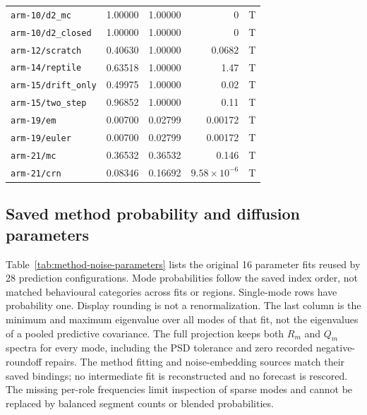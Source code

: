 \documentclass[11pt]{article}
\begin{document}
\begin{longtable}{lrrrl}
\texttt{arm-10/d2\_mc} & 1.00000 & 1.00000 & 0 & T\\
\texttt{arm-10/d2\_closed} & 1.00000 & 1.00000 & 0 & T\\
\texttt{arm-12/scratch} & 0.40630 & 1.00000 & 0.0682 & T\\
\texttt{arm-14/reptile} & 0.63518 & 1.00000 & 1.47 & T\\
\texttt{arm-15/drift\_only} & 0.49975 & 1.00000 & 0.02 & T\\
\texttt{arm-15/two\_step} & 0.96852 & 1.00000 & 0.11 & T\\
\texttt{arm-19/em} & 0.00700 & 0.02799 & 0.00172 & T\\
\texttt{arm-19/euler} & 0.00700 & 0.02799 & 0.00172 & T\\
\texttt{arm-21/mc} & 0.36532 & 0.36532 & 0.146 & T\\
\texttt{arm-21/crn} & 0.08346 & 0.16692 & \(9.58\times10^{-6}\) & T\\
\end{longtable}

\subsection{Saved method probability and diffusion parameters}
\label{sec:method-noise-parameters}
Table~\ref{tab:method-noise-parameters} lists the original 16 parameter fits
reused by 28 prediction configurations. Mode probabilities follow the saved
index order, not matched behavioural categories across fits or regions.
Single-mode rows have probability one. Display rounding is not a
renormalization. The last column is the minimum and maximum eigenvalue over
all modes of that fit, not the eigenvalues of a pooled predictive covariance.
The full projection keeps both $R_m$ and $Q_m$ spectra for every mode,
including the PSD tolerance and zero recorded negative-roundoff repairs.
The method fitting and noise-embedding sources match their saved bindings;
no intermediate fit is reconstructed and no forecast is rescored.
The missing per-role frequencies limit inspection of sparse modes and
cannot be replaced by balanced segment counts or blended probabilities.
\end{document}
